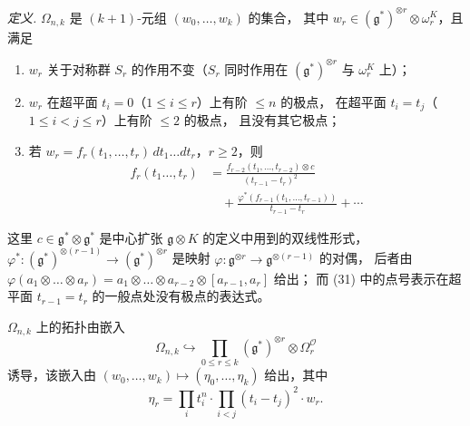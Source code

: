 \emph{定义.} $\Omega_{n,k}$ 是 $(k+1)$-元组 $(w_0,\ldots,w_k)$ 的集合，
其中 $w_r\in(\mathfrak{g}^*)^{\otimes r}\otimes\omega^K_r$，且满足
\begin{enumerate}[label=\arabic*),leftmargin=2.4em]
\item $w_r$ 关于对称群 $S_r$ 的作用不变（$S_r$ 同时作用在
  $(\mathfrak{g}^*)^{\otimes r}$ 与 $\omega^K_r$ 上）；
\item $w_r$ 在超平面 $t_i=0$（$1\le i\le r$）上有阶 $\le n$ 的极点，
  在超平面 $t_i=t_j$（$1\le i<j\le r$）上有阶 $\le 2$ 的极点，
  且没有其它极点；
\item 若 $w_r=f_r(t_1,\ldots,t_r)\,dt_1\ldots dt_r$，$r\ge 2$，则
\begin{equation}\tag{31}
\begin{aligned}
  f_r(t_1\ldots,t_r)&=\frac{f_{r-2}(t_1,\ldots,t_{r-2})\otimes c}
    {(t_{r-1}-t_r)^2}\\
  &\quad+\frac{\varphi^*(f_{r-1}(t_1,\ldots,t_{r-1}))}{t_{r-1}-t_r}+\cdots
\end{aligned}
\end{equation}
\end{enumerate}
这里 $c\in\mathfrak{g}^*\otimes\mathfrak{g}^*$ 是中心扩张
$\mathfrak{g}\otimes K$ 的定义中用到的双线性形式，
$\varphi^*:(\mathfrak{g}^*)^{\otimes(r-1)}\to(\mathfrak{g}^*)^{\otimes r}$
是映射 $\varphi:\mathfrak{g}^{\otimes r}\to\mathfrak{g}^{\otimes(r-1)}$ 的对偶，
后者由
$\varphi(a_1\otimes\ldots\otimes a_r)
=a_1\otimes\ldots\otimes a_{r-2}\otimes[a_{r-1},a_r]$ 给出；
而 (31) 中的点号表示在超平面 $t_{r-1}=t_r$ 的一般点处没有极点的表达式。

$\Omega_{n,k}$ 上的拓扑由嵌入
\[
  \Omega_{n,k}\hookrightarrow\prod_{0\le r\le k}
  (\mathfrak{g}^*)^{\otimes r}\otimes\Omega^{\mathcal{O}}_r
\]
诱导，该嵌入由 $(w_0,\ldots,w_k)\mapsto(\eta_0,\ldots,\eta_k)$ 给出，其中
\[
  \eta_r=\prod_i t_i^n\cdot\prod_{i<j}(t_i-t_j)^2\cdot w_r.
\]
